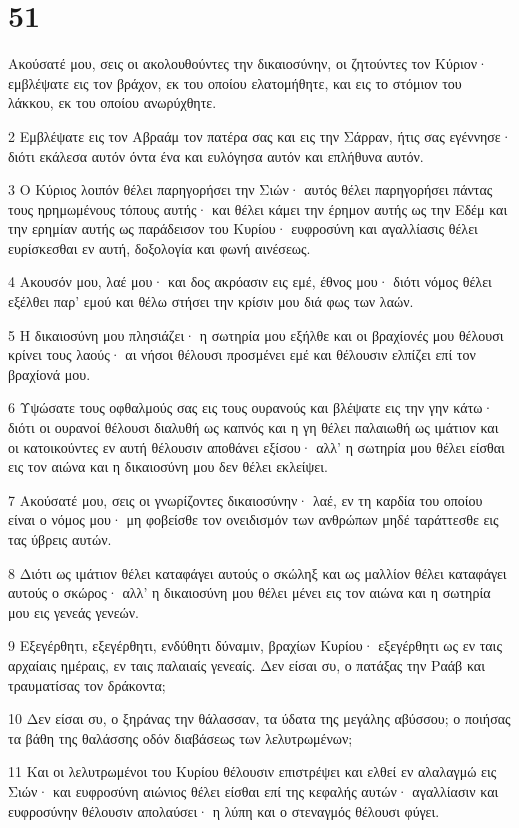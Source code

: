 \chapter{51}

\par Ακούσατέ μου, σεις οι ακολουθούντες την δικαιοσύνην, οι ζητούντες τον Κύριον· εμβλέψατε εις τον βράχον, εκ του οποίου ελατομήθητε, και εις το στόμιον του λάκκου, εκ του οποίου ανωρύχθητε.
\par 2 Εμβλέψατε εις τον Αβραάμ τον πατέρα σας και εις την Σάρραν, ήτις σας εγέννησε· διότι εκάλεσα αυτόν όντα ένα και ευλόγησα αυτόν και επλήθυνα αυτόν.
\par 3 Ο Κύριος λοιπόν θέλει παρηγορήσει την Σιών· αυτός θέλει παρηγορήσει πάντας τους ηρημωμένους τόπους αυτής· και θέλει κάμει την έρημον αυτής ως την Εδέμ και την ερημίαν αυτής ως παράδεισον του Κυρίου· ευφροσύνη και αγαλλίασις θέλει ευρίσκεσθαι εν αυτή, δοξολογία και φωνή αινέσεως.
\par 4 Ακουσόν μου, λαέ μου· και δος ακρόασιν εις εμέ, έθνος μου· διότι νόμος θέλει εξέλθει παρ' εμού και θέλω στήσει την κρίσιν μου διά φως των λαών.
\par 5 Η δικαιοσύνη μου πλησιάζει· η σωτηρία μου εξήλθε και οι βραχίονές μου θέλουσι κρίνει τους λαούς· αι νήσοι θέλουσι προσμένει εμέ και θέλουσιν ελπίζει επί τον βραχίονά μου.
\par 6 Υψώσατε τους οφθαλμούς σας εις τους ουρανούς και βλέψατε εις την γην κάτω· διότι οι ουρανοί θέλουσι διαλυθή ως καπνός και η γη θέλει παλαιωθή ως ιμάτιον και οι κατοικούντες εν αυτή θέλουσιν αποθάνει εξίσου· αλλ' η σωτηρία μου θέλει είσθαι εις τον αιώνα και η δικαιοσύνη μου δεν θέλει εκλείψει.
\par 7 Ακούσατέ μου, σεις οι γνωρίζοντες δικαιοσύνην· λαέ, εν τη καρδία του οποίου είναι ο νόμος μου· μη φοβείσθε τον ονειδισμόν των ανθρώπων μηδέ ταράττεσθε εις τας ύβρεις αυτών.
\par 8 Διότι ως ιμάτιον θέλει καταφάγει αυτούς ο σκώληξ και ως μαλλίον θέλει καταφάγει αυτούς ο σκώρος· αλλ' η δικαιοσύνη μου θέλει μένει εις τον αιώνα και η σωτηρία μου εις γενεάς γενεών.
\par 9 Εξεγέρθητι, εξεγέρθητι, ενδύθητι δύναμιν, βραχίων Κυρίου· εξεγέρθητι ως εν ταις αρχαίαις ημέραις, εν ταις παλαιαίς γενεαίς. Δεν είσαι συ, ο πατάξας την Ραάβ και τραυματίσας τον δράκοντα;
\par 10 Δεν είσαι συ, ο ξηράνας την θάλασσαν, τα ύδατα της μεγάλης αβύσσου; ο ποιήσας τα βάθη της θαλάσσης οδόν διαβάσεως των λελυτρωμένων;
\par 11 Και οι λελυτρωμένοι του Κυρίου θέλουσιν επιστρέψει και ελθεί εν αλαλαγμώ εις Σιών· και ευφροσύνη αιώνιος θέλει είσθαι επί της κεφαλής αυτών· αγαλλίασιν και ευφροσύνην θέλουσιν απολαύσει· η λύπη και ο στεναγμός θέλουσι φύγει.
